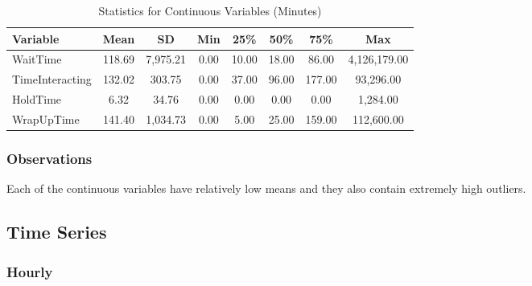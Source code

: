 \documentclass[
  letterpaper,
  DIV=11,
  numbers=noendperiod]{scrartcl}
\begin{document}
\begin{table}
\caption*{
{\large Statistics for Continuous Variables (Minutes)}
} 
\fontsize{12.0pt}{14.4pt}\selectfont
\begin{tabular*}{\linewidth}{@{\extracolsep{\fill}}lccccccc}
\toprule
Variable & Mean & SD & Min & 25\% & 50\% & 75\% & Max \\ 
\midrule\addlinespace[2.5pt]
WaitTime & 118.69 & 7,975.21 & 0.00 & 10.00 & 18.00 & 86.00 & 4,126,179.00 \\ 
TimeInteracting & 132.02 & 303.75 & 0.00 & 37.00 & 96.00 & 177.00 & 93,296.00 \\ 
HoldTime & 6.32 & 34.76 & 0.00 & 0.00 & 0.00 & 0.00 & 1,284.00 \\ 
WrapUpTime & 141.40 & 1,034.73 & 0.00 & 5.00 & 25.00 & 159.00 & 112,600.00 \\ 
\bottomrule
\end{tabular*}
\end{table}

\subsubsection{Observations}\label{observations-1}

Each of the continuous variables have relatively low means and they also
contain extremely high outliers.

\subsection{Time Series}\label{time-series}

\subsubsection{Hourly}\label{hourly}
\end{document}

